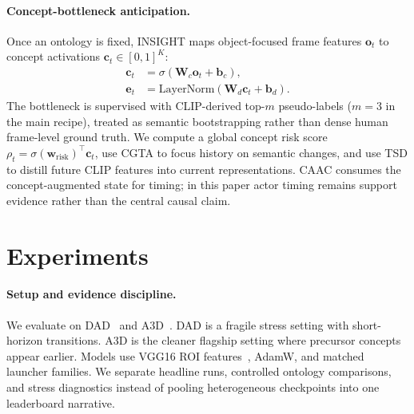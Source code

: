 \documentclass[11pt]{article}
\newcommand{\method}{\textsc{INSIGHT}}
\newcommand{\caac}{\textsc{CAAC}}
\newcommand{\cgta}{\textsc{CGTA}}
\newcommand{\tsd}{\textsc{TSD}}
\begin{document}
\paragraph{Concept-bottleneck anticipation.}
Once an ontology is fixed, \method{} maps object-focused frame features
$\mathbf{o}_t$ to concept activations $\mathbf{c}_t\in[0,1]^K$:
\begin{equation}
\begin{aligned}
  \mathbf{c}_t &= \sigma(\mathbf{W}_c\mathbf{o}_t+\mathbf{b}_c),\\
  \mathbf{e}_t &= \mathrm{LayerNorm}(\mathbf{W}_d\mathbf{c}_t+\mathbf{b}_d).
\end{aligned}
\end{equation}
The bottleneck is supervised with CLIP-derived top-$m$ pseudo-labels
($m=3$ in the main recipe), treated as semantic bootstrapping rather than dense
human frame-level ground truth. We compute a global concept risk score
$\rho_t=\sigma(\mathbf{w}_{\mathrm{risk}})^\top\mathbf{c}_t$, use \cgta{} to
focus history on semantic changes, and use \tsd{} to distill future CLIP
features into current representations. \caac{} consumes the concept-augmented
state for timing; in this paper actor timing remains support evidence rather
than the central causal claim.

\section{Experiments}

\paragraph{Setup and evidence discipline.}
We evaluate on DAD~\citep{ref4} and A3D~\citep{liao2024crash}. DAD is a
fragile stress setting with short-horizon transitions. A3D is the cleaner
flagship setting where precursor concepts appear earlier. Models use VGG16 ROI
features~\citep{ref31}, AdamW, and matched launcher families. We separate
headline runs, controlled ontology comparisons, and stress diagnostics instead
of pooling heterogeneous checkpoints into one leaderboard narrative.
\end{document}
